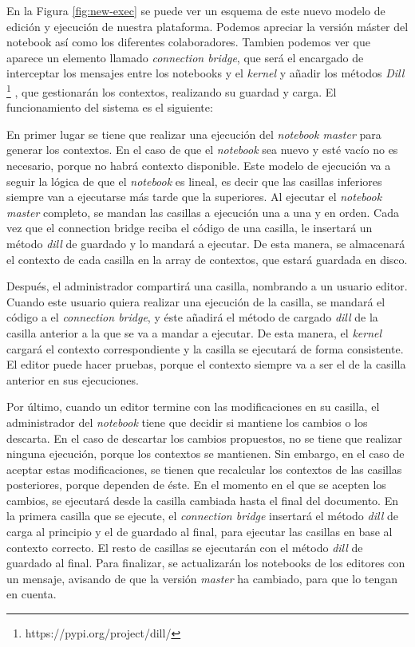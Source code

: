 \documentclass[11pt,spanish,listoffigures]{tfgetsinf}
\begin{document}
En la Figura \ref{fig:new-exec} se puede ver un esquema de este nuevo modelo de edición y ejecución de nuestra plataforma. Podemos apreciar la versión máster del notebook así como los diferentes colaboradores. Tambien podemos ver que aparece un elemento llamado \textit{connection bridge}, que será el encargado de interceptar los mensajes entre los notebooks y el \textit{kernel} y añadir los métodos \textit{Dill} \footnote{https://pypi.org/project/dill/} , que gestionarán los contextos, realizando su guardad y carga. El funcionamiento del sistema es el siguiente:

En primer lugar se tiene que realizar una ejecución del \textit{notebook master} para generar los contextos. En el caso de que el \textit{notebook} sea nuevo y esté vacío no es necesario, porque no habrá contexto disponible. Este modelo de ejecución va a seguir la lógica de que el \textit{notebook} es lineal, es decir que las casillas inferiores siempre van a ejecutarse más tarde que la superiores. Al ejecutar el \textit{notebook master} completo, se mandan las casillas a ejecución una a una y en orden. Cada vez que el connection bridge reciba el código de una casilla, le insertará un método \textit{dill} de guardado y lo mandará a ejecutar. De esta manera, se almacenará el contexto de cada casilla en la array de contextos, que estará guardada en disco. 

Después, el administrador compartirá una casilla, nombrando a un usuario editor. Cuando este usuario quiera realizar una ejecución de la casilla, se mandará el código a el \textit{connection bridge}, y éste añadirá el método de cargado \textit{dill} de la casilla anterior a la que se va a mandar a ejecutar. De esta manera, el \textit{kernel} cargará el contexto correspondiente y la casilla se ejecutará de forma consistente. El editor puede hacer pruebas, porque el contexto siempre va a ser el de la casilla anterior en sus ejecuciones.

Por último, cuando un editor termine con las modificaciones en su casilla, el administrador del \textit{notebook} tiene que decidir si mantiene los cambios o los descarta. En el caso de descartar los cambios propuestos, no se tiene que realizar ninguna ejecución, porque los contextos se mantienen. Sin embargo, en el caso de aceptar estas modificaciones, se tienen que recalcular los contextos de las casillas posteriores, porque dependen de éste. En el momento en el que se acepten los cambios, se ejecutará desde la casilla cambiada hasta el final del documento.  En la primera casilla que se ejecute, el \textit{connection bridge} insertará el método \textit{dill} de carga al principio y el de guardado al final, para ejecutar las casillas en base al contexto correcto. El resto de casillas se ejecutarán con el método \textit{dill} de guardado al final. Para finalizar, se actualizarán los notebooks de los editores con un mensaje, avisando de que la versión \textit{master} ha cambiado, para que lo tengan en cuenta.
\end{document}
